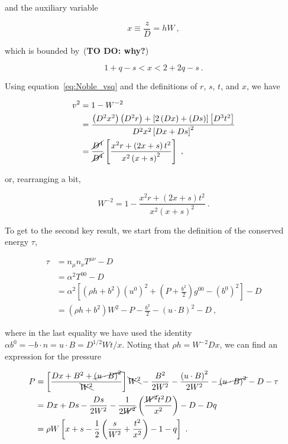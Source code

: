 \documentclass{article}
\newcommand{\bdotn}{b\cdot n}
\newcommand{\udotB}{u\cdot B}
\newcommand{\siegel}{\cite{siegel2018recovery}\xspace}
\newcommand{\todo}[1]{{\color{red}\bf TO DO: #1}\xspace}
\newcommand{\eq}[1]{
\begin{equation}
    #1
\end{equation}
}
\newcommand{\spl}[1]{
\eq{
\begin{split}
    #1
\end{split}
}
}
\begin{document}
\noindent and the auxiliary variable

\eq{
x \equiv \frac{z}{D} = h W\ ,\label{eq:Palenzuela_x}
}

\noindent which is bounded by~\siegel (\todo{why?})

\eq{ 1+q-s < x < 2 + 2q - s \ .}

Using equation~\eqref{eq:Noble_vsq} and the definitions of $r$, $s$, $t$, and $x$, we have

\spl{
  v^{2} &= 1 - W^{-2}\\
  &= \frac{\left(D^{2}x^{2}\right)\left(D^{2}r\right) + \left[2\left(Dx\right) + \left(Ds\right)\right]\left[D^{3}t^{2}\right]}{D^{2}x^{2}\left[Dx + Ds\right]^{2}}\\
  &= \frac{\cancel{D^{4}}}{\cancel{D^{4}}}\left[\frac{x^{2}r + \left(2x+s\right)t^{2}}{x^{2}\left(x+s\right)^{2}}\right]\ ,
}

\noindent or, rearranging a bit,

\eq{
  \boxed{ W^{-2} = 1 - \frac{x^{2}r + \left(2x+s\right)t^{2}}{x^{2}\left(x+s\right)^{2}} }\ .\label{eq:Palenzuela_Wminus2}
}

To get to the second key result, we start from the definition of the conserved energy $\tau$,

\spl{
  \tau &= n_{\mu}n_{\nu}T^{\mu\nu} - D\\
  &= \alpha^{2}T^{00} - D\\
  &= \alpha^{2}\left[\left(\rho h + b^{2}\right)\left(u^{0}\right)^{2} + \left(P + \frac{b^{2}}{2}\right)g^{00} - \left(b^{0}\right)^{2}\right] - D\\
  &=\left(\rho h + b^{2}\right)W^{2} - P - \frac{b^{2}}{2} - \left(\udotB\right)^{2} - D\ ,\label{eq:tau1}
}
  
\noindent where in the last equality we have used the identity $\alpha b^{0} = -\bdotn = \udotB = D^{1/2} W t / x$. Noting that $\rho h =  W^{-2} D x$, we can find an expression for the pressure

\spl{
  P &= \left[\frac{D x + B^{2} + \cancel{\left(\udotB\right)^{2}}}{\bcancel{W^{2}}}\right]\bcancel{W^{2}} - \frac{B^{2}}{2W^{2}} - \frac{\left(\udotB\right)^{2}}{2W^{2}} - \cancel{\left(\udotB\right)^{2}} - D - \tau\\
  &= D x + D s - \frac{D s}{2W^{2}} - \frac{1}{2\cancel{W^{2}}}\left(\frac{\cancel{W^{2}} t^{2} D}{x^{2}}\right) - D - D q\\
  &= \rho W\left[x + s - \frac{1}{2}\left(\frac{s}{W^{2}} + \frac{t^{2}}{x^{2}}\right) - 1 - q\right]\ .
}
\end{document}
